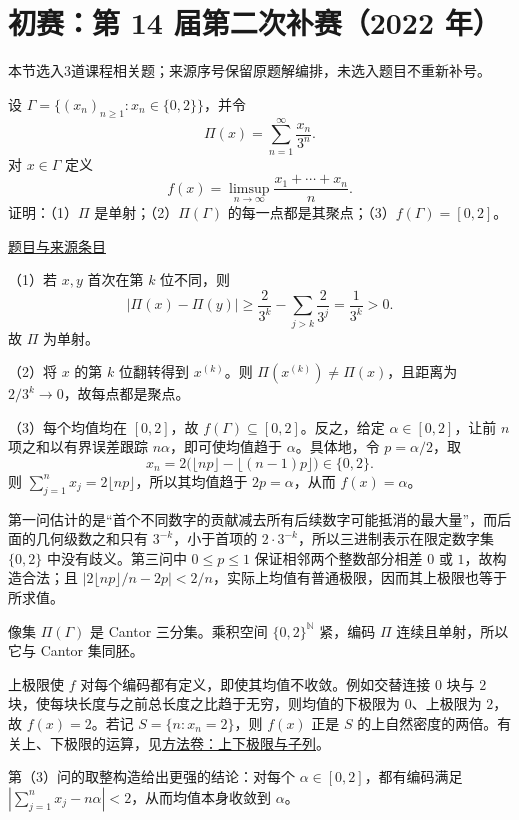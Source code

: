 \documentclass[12pt,fontset=fandol]{ctexart}
\begin{document}
\section{初赛：第 14 届第二次补赛（2022 年）}

本节选入3道课程相关题；来源序号保留原题解编排，未选入题目不重新补号。

\begin{example}[来源序号2]\label{ex:ch06-14th-A-makeup2:2}\label{pr:ch06-14th-A-makeup2:2}

设 $\Gamma=\{(x_n)_{n\geq1}:x_n\in\{0,2\}\}$，并令
\[
\Pi(x)=\sum_{n=1}^\infty\frac{x_n}{3^n}.
\]
对 $x\in\Gamma$ 定义
\[
f(x)=\limsup_{n\to\infty}\frac{x_1+\cdots+x_n}{n}.
\]
证明：（1）$\Pi$ 是单射；（2）$\Pi(\Gamma)$ 的每一点都是其聚点；（3）$f(\Gamma)=[0,2]$。

\par\href{https://github.com/lzxcr/cmc-mathematics/blob/64916fa1fdbc3e444a652eca204d5669058ee321/src/problems/preliminary/14-makeup2/02.md}{题目与来源条目}

\end{example}

\begin{solve}\label{ans:ch06-14th-A-makeup2:2}

（1）若 $x,y$ 首次在第 $k$ 位不同，则
\[
|\Pi(x)-\Pi(y)|\geq\frac2{3^k}-\sum_{j>k}\frac2{3^j}
=\frac1{3^k}>0.
\]
故 $\Pi$ 为单射。

（2）将 $x$ 的第 $k$ 位翻转得到 $x^{(k)}$。则 $\Pi(x^{(k)})\neq\Pi(x)$，且距离为 $2/3^k\to0$，故每点都是聚点。

（3）每个均值均在 $[0,2]$，故 $f(\Gamma)\subseteq[0,2]$。反之，给定 $\alpha\in[0,2]$，让前 $n$ 项之和以有界误差跟踪 $n\alpha$，即可使均值趋于 $\alpha$。具体地，令 $p=\alpha/2$，取
\[
x_n=2\bigl(\lfloor np\rfloor-\lfloor(n-1)p\rfloor\bigr)\in\{0,2\}.
\]
则 $\sum_{j=1}^n x_j=2\lfloor np\rfloor$，所以其均值趋于 $2p=\alpha$，从而 $f(x)=\alpha$。

第一问估计的是“首个不同数字的贡献减去所有后续数字可能抵消的最大量”，而后面的几何级数之和只有 $3^{-k}$，小于首项的 $2\cdot3^{-k}$，所以三进制表示在限定数字集 $\{0,2\}$ 中没有歧义。第三问中 $0\le p\le1$ 保证相邻两个整数部分相差 $0$ 或 $1$，故构造合法；且 $|2\lfloor np\rfloor/n-2p|<2/n$，实际上均值有普通极限，因而其上极限也等于所求值。

\end{solve}

\begin{remark}[方法与条件]像集 $\Pi(\Gamma)$ 是 Cantor 三分集。乘积空间 $\{0,2\}^{\mathbb N}$ 紧，编码 $\Pi$ 连续且单射，所以它与 Cantor 集同胚。

上极限使 $f$ 对每个编码都有定义，即使其均值不收敛。例如交替连接 $0$ 块与 $2$ 块，使每块长度与之前总长度之比趋于无穷，则均值的下极限为 $0$、上极限为 $2$，故 $f(x)=2$。若记 $S=\{n:x_n=2\}$，则 $f(x)$ 正是 $S$ 的上自然密度的两倍。有关上、下极限的运算，见\hyperref[app:limit-limsup]{方法卷：上下极限与子列}。

第（3）问的取整构造给出更强的结论：对每个 $\alpha\in[0,2]$，都有编码满足 $|\sum_{j=1}^n x_j-n\alpha|<2$，从而均值本身收敛到 $\alpha$。\end{remark}
\end{document}
